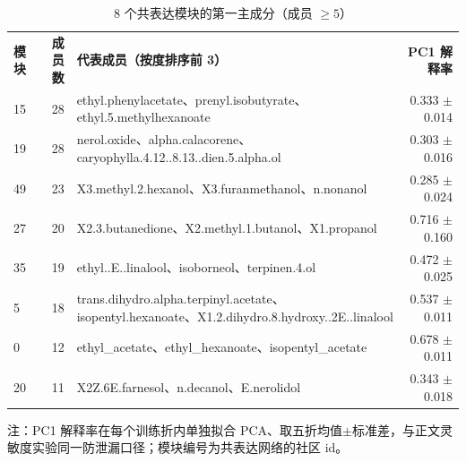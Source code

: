 \begin{table}[H]
\centering\small
\caption{8 个共表达模块的第一主成分（成员 $\ge 5$）}
\begin{tabularx}{\textwidth}{@{}l r Y r@{}}
\toprule
\textbf{模块} & \textbf{成员数} & \textbf{代表成员（按度排序前 3）} & \textbf{PC1 解释率} \\
15 & 28 & ethyl.\allowbreak{}phenylacetate、prenyl.\allowbreak{}isobutyrate、ethyl.\allowbreak{}5.\allowbreak{}methylhexanoate & 0.333 $\pm$ 0.014 \\
19 & 28 & nerol.\allowbreak{}oxide、alpha.\allowbreak{}calacorene、caryophylla.\allowbreak{}4.\allowbreak{}12.\allowbreak{}.\allowbreak{}8.\allowbreak{}13.\allowbreak{}.\allowbreak{}dien.\allowbreak{}5.\allowbreak{}alpha.\allowbreak{}ol & 0.303 $\pm$ 0.016 \\
49 & 23 & X3.\allowbreak{}methyl.\allowbreak{}2.\allowbreak{}hexanol、X3.\allowbreak{}furanmethanol、n.\allowbreak{}nonanol & 0.285 $\pm$ 0.024 \\
27 & 20 & X2.\allowbreak{}3.\allowbreak{}butanedione、X2.\allowbreak{}methyl.\allowbreak{}1.\allowbreak{}butanol、X1.\allowbreak{}propanol & 0.716 $\pm$ 0.160 \\
35 & 19 & ethyl.\allowbreak{}.\allowbreak{}E.\allowbreak{}.\allowbreak{}linalool、isoborneol、terpinen.\allowbreak{}4.\allowbreak{}ol & 0.472 $\pm$ 0.025 \\
5 & 18 & trans.\allowbreak{}dihydro.\allowbreak{}alpha.\allowbreak{}terpinyl.\allowbreak{}acetate、isopentyl.\allowbreak{}hexanoate、X1.\allowbreak{}2.\allowbreak{}dihydro.\allowbreak{}8.\allowbreak{}hydroxy.\allowbreak{}.\allowbreak{}2E.\allowbreak{}.\allowbreak{}linalool & 0.537 $\pm$ 0.011 \\
0 & 12 & ethyl\_acetate、ethyl\_hexanoate、isopentyl\_acetate & 0.678 $\pm$ 0.011 \\
20 & 11 & X2Z.\allowbreak{}6E.\allowbreak{}farnesol、n.\allowbreak{}decanol、E.\allowbreak{}nerolidol & 0.343 $\pm$ 0.018 \\
\bottomrule
\end{tabularx}
\par\vspace{0.3em}\noindent\footnotesize 注：PC1 解释率在每个训练折内单独拟合 PCA、取五折均值$\pm$标准差，与正文灵敏度实验同一防泄漏口径；模块编号为共表达网络的社区 id。
\end{table}

